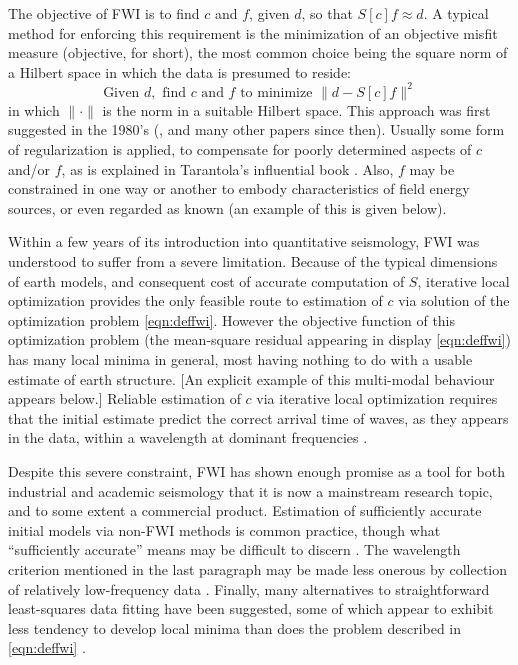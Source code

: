 The objective of FWI is to find $c$ and $f$, given $d$, so that
$S[c]f \approx d$. A typical method for enforcing this requirement is
the minimization of an objective misfit measure (objective, for
short), the most common choice being the square norm of a Hilbert
space in which the data is presumed to reside:
\begin{equation}
  \label{eqn:deffwi}
  \mbox{Given } d, \mbox{ find }c \mbox{ and }f \mbox{ to
    minimize }
  \|d -  S[c]f\|^2
\end{equation}
in which $\|\cdot\|$ is the norm in a suitable Hilbert space. This
approach was first suggested in the 1980's
(\cite[]{BamChavLai:79,Tara:84a,KolbColLai:86,Crasetal:90}, and many
other papers since then). Usually some form of regularization is
applied, to compensate for poorly determined aspects of $c$ and/or
$f$, as is explained in Tarantola's influential book
\cite[]{Tarantola:05}. Also, $f$ may be constrained in one way or
another to embody characteristics of field energy sources, or even
regarded as known (an example of this is given below).

Within a few years of its introduction into quantitative seismology,
FWI was understood to suffer from a severe limitation. Because of the
typical dimensions of earth models, and consequent cost of accurate
computation of $S$, iterative local optimization provides the only
feasible route to estimation of $c$ via solution of the optimization
problem \ref{eqn:deffwi}. However the objective function of this
optimization problem (the mean-square residual appearing in display \ref{eqn:deffwi}) has many local minima in general, most
having nothing to do with a usable estimate of earth structure. [An
explicit example of this multi-modal behaviour appears below.]
Reliable estimation of $c$ via iterative local optimization requires
that the initial estimate predict the correct arrival time of waves,
as they appears in the data, within a wavelength at dominant
frequencies \cite[]{GauTarVir:86,VirieuxOperto:09}.

Despite this severe constraint, FWI has shown enough promise as a tool
for both industrial and academic seismology that it is now a
mainstream research topic, and to some extent a commercial
product. Estimation of sufficiently accurate initial models via
non-FWI methods is common practice, though what ``sufficiently
accurate'' means may be difficult to discern
\cite[]{Plessix:10}. The wavelength criterion mentioned in the last
paragraph may be made less onerous by collection of relatively
low-frequency data \cite[]{Wolfspar:16}. Finally, many alternatives to
straightforward least-squares data fitting have been suggested, some
of which appear to exhibit less tendency to develop local minima than
does the problem described in \ref{eqn:deffwi} \cite[]{Symes:09}.

